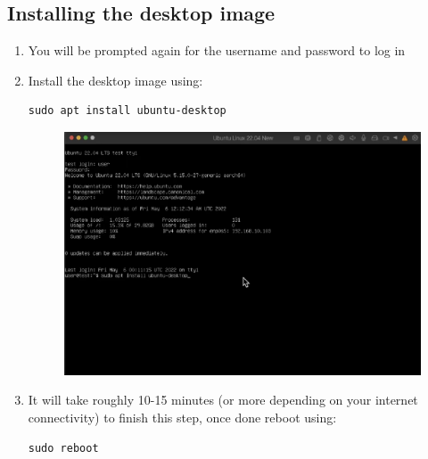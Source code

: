 \documentclass[11pt,a4paper]{article}
\begin{document}
\subsection{Installing the desktop image}
\begin{enumerate}
    \item You will be prompted again for the username and password to log in
    \item Install the desktop image using:
\begin{lstlisting}
sudo apt install ubuntu-desktop
\end{lstlisting}
    \begin{figure}[htp]
            \centering
            \includegraphics[width=0.6\linewidth]{images/step22.png}
        \end{figure}
    \item It will take roughly 10-15 minutes (or more depending on your internet connectivity) to finish this step, once done reboot using:
\begin{lstlisting}
sudo reboot
\end{lstlisting}
\end{enumerate}
\end{document}
